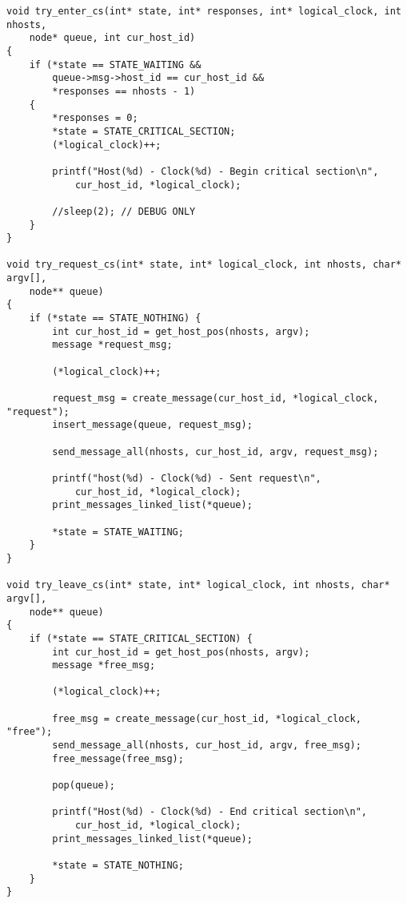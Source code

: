 \begin{lstlisting}[caption={Fonctions de mise à jour d'état}]
void try_enter_cs(int* state, int* responses, int* logical_clock, int nhosts,
    node* queue, int cur_host_id)
{
    if (*state == STATE_WAITING &&
        queue->msg->host_id == cur_host_id &&
        *responses == nhosts - 1)
    {
        *responses = 0;
        *state = STATE_CRITICAL_SECTION;
        (*logical_clock)++;

        printf("Host(%d) - Clock(%d) - Begin critical section\n",
            cur_host_id, *logical_clock);

        //sleep(2); // DEBUG ONLY
    }
}

void try_request_cs(int* state, int* logical_clock, int nhosts, char* argv[],
    node** queue)
{
    if (*state == STATE_NOTHING) {
        int cur_host_id = get_host_pos(nhosts, argv);
        message *request_msg;

        (*logical_clock)++;

        request_msg = create_message(cur_host_id, *logical_clock, "request");
        insert_message(queue, request_msg);

        send_message_all(nhosts, cur_host_id, argv, request_msg);

        printf("host(%d) - Clock(%d) - Sent request\n",
            cur_host_id, *logical_clock);
        print_messages_linked_list(*queue);

        *state = STATE_WAITING;
    }
}

void try_leave_cs(int* state, int* logical_clock, int nhosts, char* argv[],
    node** queue)
{
    if (*state == STATE_CRITICAL_SECTION) {
        int cur_host_id = get_host_pos(nhosts, argv);
        message *free_msg;

        (*logical_clock)++;

        free_msg = create_message(cur_host_id, *logical_clock, "free");
        send_message_all(nhosts, cur_host_id, argv, free_msg);
        free_message(free_msg);

        pop(queue);

        printf("Host(%d) - Clock(%d) - End critical section\n",
            cur_host_id, *logical_clock);
        print_messages_linked_list(*queue);

        *state = STATE_NOTHING;
    }
}
\end{lstlisting}

